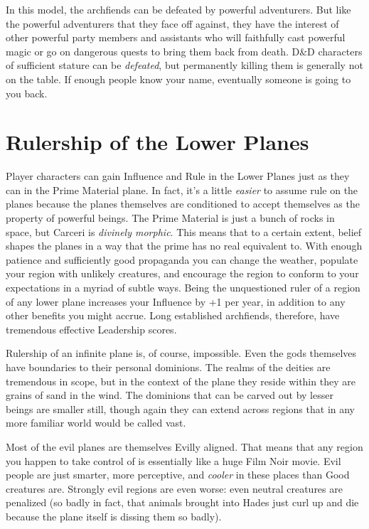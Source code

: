 In this model, the archfiends can be defeated by powerful adventurers. But like the powerful adventurers that they face off against, they have the interest of other powerful party members and assistants who will faithfully cast powerful magic or go on dangerous quests to bring them back from death. D\&D characters of sufficient stature can be \textit{defeated}, but permanently killing them is generally not on the table. If enough people know your name, eventually someone is going to  you back.


\section{Rulership of the Lower Planes}

Player characters can gain Influence and Rule in the Lower Planes just as they can in the Prime Material plane. In fact, it's a little \textit{easier} to assume rule on the planes because the planes themselves are conditioned to accept themselves as the property of powerful beings. The Prime Material is just a bunch of rocks in space, but Carceri is \textit{divinely morphic}. This means that to a certain extent, belief shapes the planes in a way that the prime has no real equivalent to. With enough patience and sufficiently good propaganda you can change the weather, populate your region with unlikely creatures, and encourage the region to conform to your expectations in a myriad of subtle ways. Being the unquestioned ruler of a region of any lower plane increases your Influence by +1 per year, in addition to any other benefits you might accrue. Long established archfiends, therefore, have tremendous effective Leadership scores.

Rulership of an infinite plane is, of course, impossible. Even the gods themselves have boundaries to their personal dominions. The realms of the deities are tremendous in scope, but in the context of the plane they reside within they are grains of sand in the wind. The dominions that can be carved out by lesser beings are smaller still, though again they can extend across regions that in any more familiar world would be called vast.

Most of the evil planes are themselves Evilly aligned. That means that any region you happen to take control of is essentially like a huge Film Noir movie. Evil people are just smarter, more perceptive, and \textit{cooler} in these places than Good creatures are. Strongly evil regions are even worse: even neutral creatures are penalized (so badly in fact, that animals brought into Hades just curl up and die because the plane itself is dissing them so badly).

